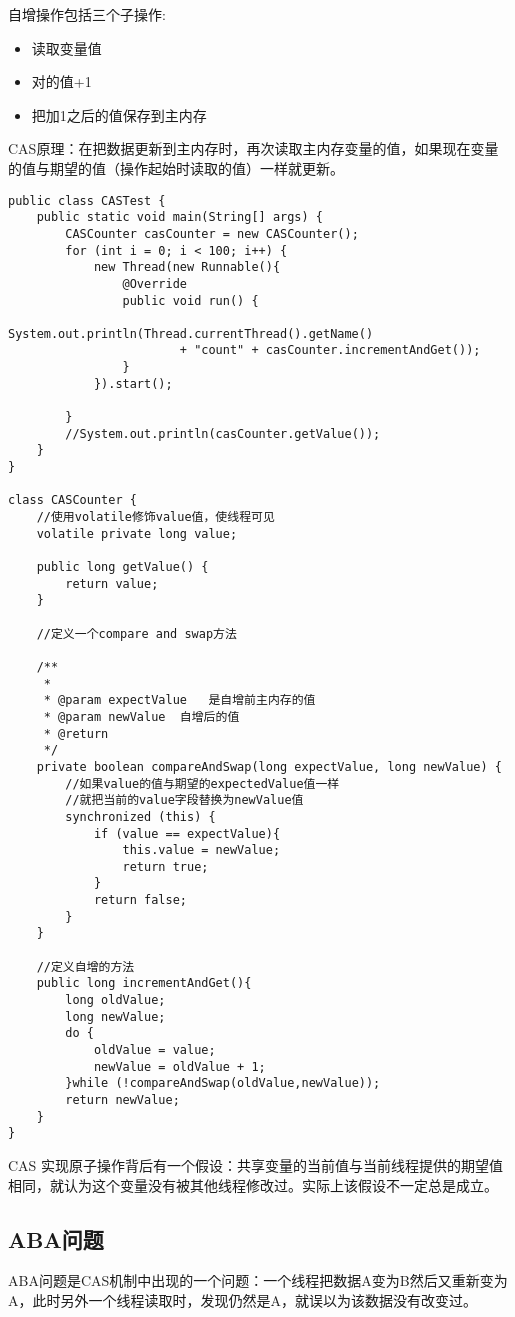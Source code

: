 \documentclass[a4paper]{report}
\begin{document}
自增操作包括三个子操作:
\begin{itemize}
  \item 读取变量值
  \item 对的值+1
  \item 把加1之后的值保存到主内存
\end{itemize}
CAS原理：在把数据更新到主内存时，再次读取主内存变量的值，如果现在变量的值与期望的值（操作起始时读取的值）一样就更新。
\begin{Verbatim}[frame=single,numbersep=5pt,xleftmargin=1.5em,xrightmargin=1.5em]
public class CASTest {
    public static void main(String[] args) {
        CASCounter casCounter = new CASCounter();
        for (int i = 0; i < 100; i++) {
            new Thread(new Runnable(){
                @Override
                public void run() {
                    System.out.println(Thread.currentThread().getName()
                        + "count" + casCounter.incrementAndGet());
                }
            }).start();

        }
        //System.out.println(casCounter.getValue());
    }
}

class CASCounter {
    //使用volatile修饰value值，使线程可见
    volatile private long value;

    public long getValue() {
        return value;
    }

    //定义一个compare and swap方法

    /**
     *
     * @param expectValue   是自增前主内存的值
     * @param newValue  自增后的值
     * @return
     */
    private boolean compareAndSwap(long expectValue, long newValue) {
        //如果value的值与期望的expectedValue值一样
        //就把当前的value字段替换为newValue值
        synchronized (this) {
            if (value == expectValue){
                this.value = newValue;
                return true;
            }
            return false;
        }
    }

    //定义自增的方法
    public long incrementAndGet(){
        long oldValue;
        long newValue;
        do {
            oldValue = value;
            newValue = oldValue + 1;
        }while (!compareAndSwap(oldValue,newValue));
        return newValue;
    }
}
\end{Verbatim}

CAS 实现原子操作背后有一个假设：共享变量的当前值与当前线程提供的期望值相同，就认为这个变量没有被其他线程修改过。实际上该假设不一定总是成立。
\subsection{ABA问题}
ABA问题是CAS机制中出现的一个问题：一个线程把数据A变为B然后又重新变为A，此时另外一个线程读取时，发现仍然是A，就误以为该数据没有改变过。
\end{document}
